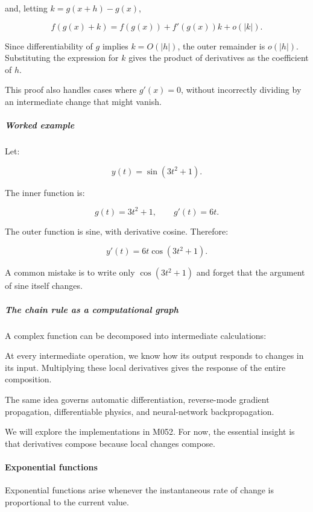 and, letting \(k=g(x+h)-g(x)\),

\[
f(g(x)+k)=f(g(x))+f'(g(x))k+o(|k|).
\]

Since differentiability of \(g\) implies \(k=O(|h|)\), the outer remainder is \(o(|h|)\). Substituting the expression for \(k\) gives the product of derivatives as the coefficient of \(h\).

This proof also handles cases where \(g'(x)=0\), without incorrectly dividing by an intermediate change that might vanish.

\begin{allmightroleexample}

\subparagraph{Worked example}\label{01-foundations-i-ch020-worked-example}

Let:

\end{allmightroleexample}

\[
y(t)=\sin(3t^2+1).
\]

The inner function is:

\[
g(t)=3t^2+1,\qquad g'(t)=6t.
\]

The outer function is sine, with derivative cosine. Therefore:

\[
\boxed{y'(t)=6t\cos(3t^2+1)}.
\]

A common mistake is to write only \(\cos(3t^2+1)\) and forget that the argument of sine itself changes.

\subparagraph{The chain rule as a computational graph}\label{01-foundations-i-ch020-the-chain-rule-as-a-computational-graph}

A complex function can be decomposed into intermediate calculations:

At every intermediate operation, we know how its output responds to changes in its input. Multiplying these local derivatives gives the response of the entire composition.

The same idea governs automatic differentiation, reverse-mode gradient propagation, differentiable physics, and neural-network backpropagation.

We will explore the implementations in M052. For now, the essential insight is that derivatives compose because local changes compose.

\paragraph{Exponential functions}\label{01-foundations-i-ch020-exponential-functions}

Exponential functions arise whenever the instantaneous rate of change is proportional to the current value.

